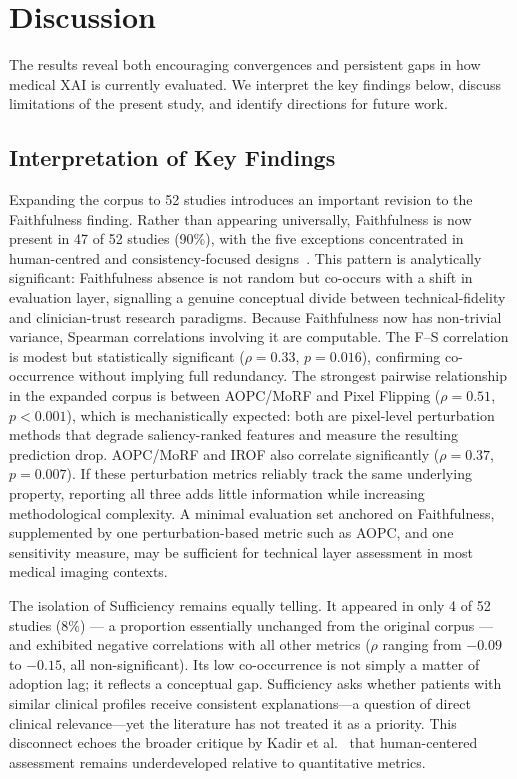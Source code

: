 \newpage
\section{Discussion}

The results reveal both encouraging convergences and persistent gaps in how
medical XAI is currently evaluated. We interpret the key findings below,
discuss limitations of the present study, and identify directions for future
work.

\subsection{Interpretation of Key Findings}

Expanding the corpus to 52 studies introduces an important revision to the
Faithfulness finding. Rather than appearing universally, Faithfulness is
now present in 47 of 52 studies (90\%), with the five exceptions
concentrated in human-centred and consistency-focused
designs~\cite{rezaeian2026explainability,finzel2024human,bauer2025human,qin2025consistency,alpsalaz2026explainability}.
This pattern is analytically significant: Faithfulness absence is not
random but co-occurs with a shift in evaluation layer, signalling a genuine
conceptual divide between technical-fidelity and clinician-trust research
paradigms. Because Faithfulness now has non-trivial variance, Spearman
correlations involving it are computable. The F--S correlation is modest
but statistically significant ($\rho = 0.33$, $p = 0.016$), confirming
co-occurrence without implying full redundancy. The strongest pairwise
relationship in the expanded corpus is between AOPC/MoRF and Pixel
Flipping ($\rho = 0.51$, $p < 0.001$), which is mechanistically expected:
both are pixel-level perturbation methods that degrade saliency-ranked
features and measure the resulting prediction drop. AOPC/MoRF and IROF
also correlate significantly ($\rho = 0.37$, $p = 0.007$). If these
perturbation metrics reliably track the same underlying property,
reporting all three adds little information while increasing methodological
complexity. A minimal evaluation set anchored on Faithfulness, supplemented
by one perturbation-based metric such as AOPC, and one sensitivity measure,
may be sufficient for technical layer assessment in most medical imaging
contexts.

The isolation of Sufficiency remains equally telling. It appeared in only
4 of 52 studies (8\%) --- a proportion essentially unchanged from the
original corpus --- and exhibited negative correlations with all other
metrics ($\rho$ ranging from $-0.09$ to $-0.15$, all non-significant).
Its low co-occurrence is not simply a matter of adoption lag; it reflects
a conceptual gap. Sufficiency asks whether patients with similar clinical
profiles receive consistent explanations---a question of direct clinical
relevance---yet the literature has not treated it as a priority. This
disconnect echoes the broader critique by Kadir et al.~\cite{kadir2023evaluation}
that human-centered assessment remains underdeveloped relative to
quantitative metrics.

